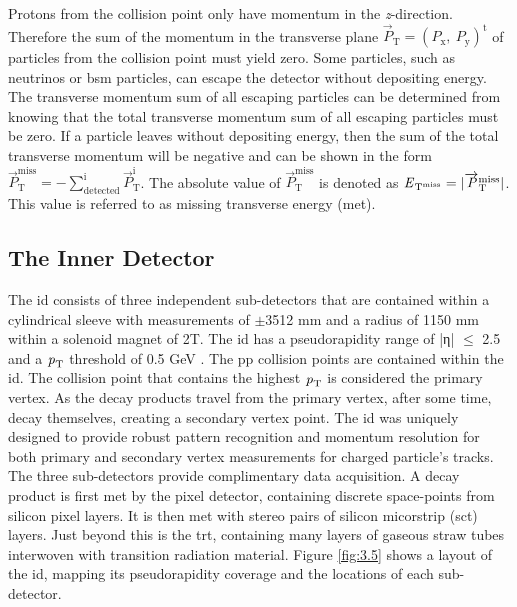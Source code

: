 Protons from the collision point only have momentum in the \textit{z}-direction. Therefore the sum 
of the momentum in the transverse plane $\overrightarrow{\textit{P}}_{\textrm{T}} = (\textit{P}_{\textrm{x}}, \ \textit{P}_\textrm{y})^{\textrm{t}}$ 
of particles from the collision point must yield zero. Some particles, such as neutrinos or \gls{bsm} particles,
can escape the detector without depositing energy. The transverse momentum sum of all escaping 
particles can be determined from knowing that the total transverse momentum sum of all escaping particles 
must be zero. If a particle leaves without depositing energy, then the sum of the total transverse 
momentum will be negative and can be shown in the form $\overrightarrow{\textit{P}}_{\textrm{T}}^{\textrm{miss}} = - \sum_{\textrm{detected}}^{\textrm{i}}\overrightarrow{\textit{P}}_{\textrm{T}}^{\textrm{i}}$.
The absolute value of $\overrightarrow{\textit{P}}_{\textrm{T}}^{\textrm{miss}}$ is denoted as $\textrm{\textit{E}}_{\textrm{T}^{\textrm{miss}}}=|\overrightarrow{\textit{P}}_{\textrm{T}}^{\textrm{miss}}|$.
This value is referred to as missing transverse energy (\gls{met}).

\subsection{The Inner Detector}
\par
The \gls{id} consists of three independent sub-detectors that are contained within a cylindrical sleeve with 
measurements of $\pm$3512 mm and a radius of 1150 mm within a solenoid magnet of 2T. The \gls{id} has a pseudorapidity 
range of |η| $\le$ 2.5 and a $\textrm{\textit{p}}_{\textrm{T}}$ threshold of 0.5 GeV \cite{atlas}. 
The \gls{pp} collision points are contained within the \gls{id}. The collision point that contains the highest $\textrm{\textit{p}}_{\textrm{T}}$ is considered the primary vertex. As the decay products travel 
from the primary vertex, after some time, decay themselves, creating a secondary vertex point.
The \gls{id} was uniquely designed to provide robust pattern recognition and momentum resolution
for both primary and secondary vertex measurements for charged particle's tracks. The three sub-detectors provide 
complimentary data acquisition. A decay product is first met by the pixel detector, containing discrete space-points from 
silicon pixel layers. It is then met with stereo pairs of silicon micorstrip (\gls{sct}) layers. Just beyond this is the \gls{trt},
containing many layers of gaseous straw tubes interwoven with transition radiation material. Figure \ref{fig:3.5} shows a layout of the 
\gls{id}, mapping its pseudorapidity coverage and the locations of each sub-detector.

